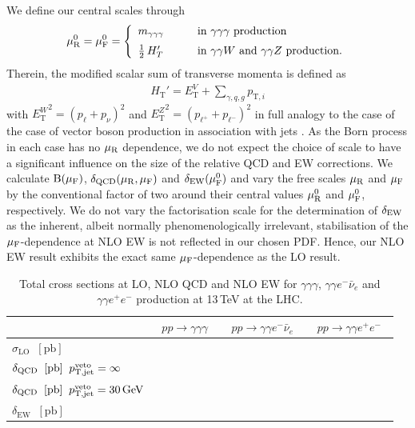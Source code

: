 We define our central scales through
\begin{equation}
  \label{eq:murfdef}
  \begin{split}
    \mu_{\mathrm{R}}^0 = \mu_{\mathrm{F}}^0 = \left\{
    \begin{array}{ll}
      m_{\gamma\gamma\gamma} \qquad & \text{in \ensuremath{\gamma\gamma\gamma}\ production} \\[2mm]
      \tfrac{1}{2}\,H_T' & \text{in \ensuremath{\gamma\gamma W}\ and \ensuremath{\gamma\gamma Z}\ production.}
    \end{array}\right.
  \end{split}
\end{equation}
Therein, the modified scalar sum of transverse momenta is defined as 
\begin{equation}
  \label{ew:defHT}
  \begin{split}
    H_\mathrm{T}' = E_\mathrm{T}^V + \sum_{\gamma,q,g} p_{\mathrm{T},i}
  \end{split}
\end{equation}
with $\left.E_\mathrm{T}^W\right.^2=(p_\ell+p_\nu)^2$ and 
$\left.E_\mathrm{T}^Z\right.^2=(p_{\ell^+}+p_{\ell^-})^2$ 
in full analogy to the case of the case of vector boson production 
in association with jets \cite{}.
As the Born process in each case has no $\mu_{\mathrm{R}}$ dependence, we 
do not expect the choice of scale to have a significant influence 
on the size of the relative QCD and EW corrections.
We calculate $\mathrm{B}(\mu_{\mathrm{F}})$, $\delta_\text{QCD}(\mu_{\mathrm{R}},\mu_{\mathrm{F}})$ and 
$\delta_\text{EW}(\mu_{\mathrm{F}}^0)$ and vary the free scales $\mu_{\mathrm{R}}$ and $\mu_{\mathrm{F}}$ 
by the conventional factor of two around their central values 
$\mu_{\mathrm{R}}^0$ and $\mu_{\mathrm{F}}^0$, respectively.
We do not vary the factorisation scale for the determination 
of $\delta_\text{EW}$ as the inherent, albeit normally phenomenologically 
irrelevant, stabilisation of the $\mu_{\mathrm{F}}$-dependence at NLO EW 
is not reflected in our chosen PDF.
Hence, our NLO EW result exhibits the exact same $\mu_{\mathrm{F}}$-dependence 
as the LO result.


\begin{table}[t!]
  \centering
  \begin{tabular}{l||c|c|c}
      & $\;\;pp \to \gamma \gamma\gamma\;\;$
      & $\;\;pp \to \gamma \gamma e^-\bar\nu_e\;\;$ 
      & $\;\;pp \to \gamma \gamma e^+e^-\;\;$ \\
    \hline\hline
    $\sigma_\text{LO}\;\;[\text{pb}] $ &  &  & \\
    \hline
    $\delta_\text{QCD}\;\;[\text{pb}]\;\;p_\text{T,jet}^\text{veto}=\infty $ &  &  & \\
    \hline
    $\delta_\text{QCD}\;\;[\text{pb}]\;\;p_\text{T,jet}^\text{veto}=30\,\text{GeV} $ &  &  & \\
    \hline
    $\delta_\text{EW}\;\;[\text{pb}] $ &  &  & \\
  \end{tabular}
  \caption{
    Total cross sections at LO, NLO QCD and NLO EW for $\gamma\gamma\gamma$, 
    $\gamma\gamma e^-\bar\nu_e$ and $\gamma\gamma e^+e^-$
    production at 13\,TeV at the LHC.
    \label{tab:xsec}
  } 
\end{table}


